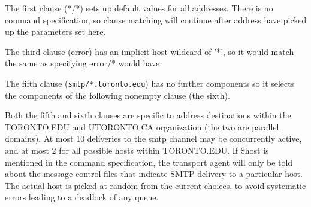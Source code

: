 

The  first  clause  (*/*)  sets up default values for all
addresses.  There is no command specification,  so  clause
matching  will  continue  after address have picked up the
parameters set here.

The third clause (error) has an implicit host wildcard  of
'*',  so  it  would  match  the same as specifying error/*
would have.

The fifth clause ({\tt smtp/*.toronto.edu}) has no further  
components so it selects the components of the following nonempty 
clause (the sixth).

Both the fifth and sixth clauses are specific  to  address
destinations  within the TORONTO.EDU and UTORONTO.CA 
organization (the two  are  parallel  domains).   At  most  10
deliveries to the smtp channel may be concurrently active,
and at most 2 for all possible hosts  within  TORONTO.EDU.
If \$host  is  mentioned in the command specification, the
transport agent will only be told about the  message  control  
files that indicate SMTP delivery to a particular
host. The actual host is picked at random from the  current  
choices, to avoid systematic errors leading to a deadlock of any queue.

